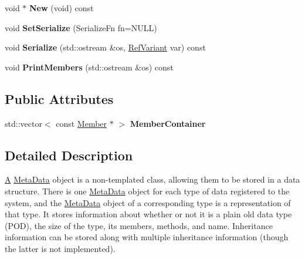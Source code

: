 \begin{DoxyCompactItemize}
\item 
\hypertarget{classDCEngine_1_1MetaData_a11d1ef4eb5ad03bde273c00f4078ec27}{void $\ast$ {\bfseries New} (void) const }\label{classDCEngine_1_1MetaData_a11d1ef4eb5ad03bde273c00f4078ec27}

\item 
\hypertarget{classDCEngine_1_1MetaData_a6c55ebf3aa72651250c0a476a81c3d74}{void {\bfseries Set\-Serialize} (Serialize\-Fn fn=N\-U\-L\-L)}\label{classDCEngine_1_1MetaData_a6c55ebf3aa72651250c0a476a81c3d74}

\item 
\hypertarget{classDCEngine_1_1MetaData_ab9f13a8fa30b98f236e47e7ff34b91dd}{void {\bfseries Serialize} (std\-::ostream \&os, \hyperlink{classDCEngine_1_1RefVariant}{Ref\-Variant} var) const }\label{classDCEngine_1_1MetaData_ab9f13a8fa30b98f236e47e7ff34b91dd}

\item 
\hypertarget{classDCEngine_1_1MetaData_a5cca31494125e0e0e847438924ce0b7f}{void {\bfseries Print\-Members} (std\-::ostream \&os) const }\label{classDCEngine_1_1MetaData_a5cca31494125e0e0e847438924ce0b7f}

\end{DoxyCompactItemize}
\subsection*{Public Attributes}
\begin{DoxyCompactItemize}
\item 
\hypertarget{classDCEngine_1_1MetaData_a873a7573e28a2c8f1115638d75a73a18}{std\-::vector$<$ const \hyperlink{classDCEngine_1_1Member}{Member} $\ast$ $>$ {\bfseries Member\-Container}}\label{classDCEngine_1_1MetaData_a873a7573e28a2c8f1115638d75a73a18}

\end{DoxyCompactItemize}


\subsection{Detailed Description}
\hyperlink{classA}{A} \hyperlink{classDCEngine_1_1MetaData}{Meta\-Data} object is a non-\/templated class, allowing them to be stored in a data structure. There is one \hyperlink{classDCEngine_1_1MetaData}{Meta\-Data} object for each type of data registered to the system, and the \hyperlink{classDCEngine_1_1MetaData}{Meta\-Data} object of a corresponding type is a representation of that type. It stores information about whether or not it is a plain old data type (P\-O\-D), the size of the type, its members, methods, and name. Inheritance information can be stored along with multiple inheritance information (though the latter is not implemented). 

